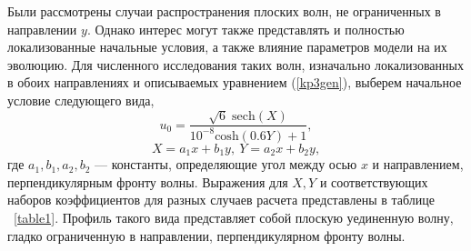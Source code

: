 

Были рассмотрены случаи распространения плоских волн, не ограниченных в направлении $y$. Однако интерес могут также представлять и полностью локализованные начальные условия, а также влияние параметров модели на их эволюцию. Для численного исследования таких волн, изначально локализованных в обоих направлениях и описываемых уравнением (\ref{kp3gen}), выберем начальное условие следующего вида,
\begin{equation}\label{init}
	u_0 = \frac{\sqrt{6}\;\mathrm{sech}(X)}{10^{-8} \mathrm
		{cosh} (0.6 Y)+1},
\end{equation}
$$
X = a_1 x + b_1 y, ~Y = a_2 x + b_2 y,
$$
где $a_1, b_1, a_2, b_2$ --- константы, определяющие угол между осью $x$ и направлением, перпендикулярным фронту волны. Выражения для $X, Y$ и соответствующих наборов коэффициентов для разных случаев расчета представлены в таблице ~\ref{table1}. Профиль такого вида представляет собой плоскую уединенную волну, гладко ограниченную в направлении, перпендикулярном фронту волны. 

